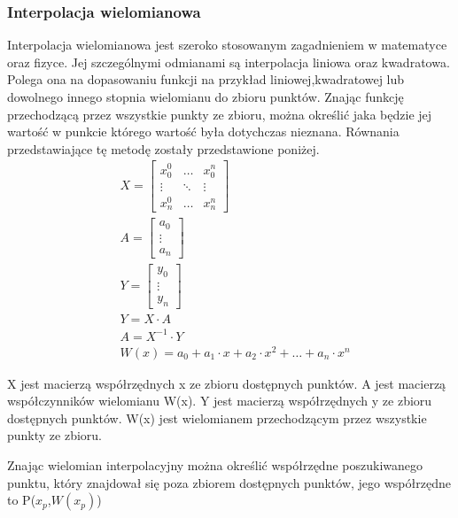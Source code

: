 \subsubsection{Interpolacja wielomianowa}
Interpolacja wielomianowa jest szeroko stosowanym zagadnieniem w matematyce oraz fizyce. Jej szczególnymi odmianami są interpolacja liniowa oraz kwadratowa. Polega ona na dopasowaniu funkcji na przykład liniowej,kwadratowej lub dowolnego innego stopnia wielomianu do zbioru punktów. Znając funkcję przechodzącą przez wszystkie punkty ze zbioru, można określić jaka będzie jej wartość w punkcie którego wartość była dotychczas nieznana. Równania przedstawiające tę metodę zostały przedstawione poniżej.
\begin{equation}
    \begin{aligned}
            &X=\begin{bmatrix}
                    x_{0}^0 &\dots & x_{0}^n\\
                     \vdots  & \ddots & \vdots \\
                    x_{n}^0 &\dots & x_{n}^n
                \end{bmatrix}\\
            &A=\begin{bmatrix}
                    a_{0}\\
                      \vdots \\
                    a_{n}
                \end{bmatrix}\\
            &Y=\begin{bmatrix}
                y_{0}\\
                  \vdots \\
                y_{n}
            \end{bmatrix}\\
            &Y=X \cdot A\\
            &A=X^{-1} \cdot Y\\
            & W(x)=a_{0}+a_{1}\cdot x +a_{2}\cdot x^2+\ldots +a_{n}\cdot x^n
    \end{aligned}
    \label{equ:wielomianowaEqu}
\end{equation}

X jest macierzą współrzędnych x ze zbioru dostępnych punktów. A jest macierzą współczynników wielomianu W(x). Y jest macierzą współrzędnych y ze zbioru dostępnych punktów. W(x) jest wielomianem przechodzącym przez wszystkie punkty ze zbioru.

Znając wielomian interpolacyjny można określić współrzędne poszukiwanego punktu, który znajdował się poza zbiorem dostępnych punktów, jego współrzędne to P($x_{p}$,$W(x_{p})$)
